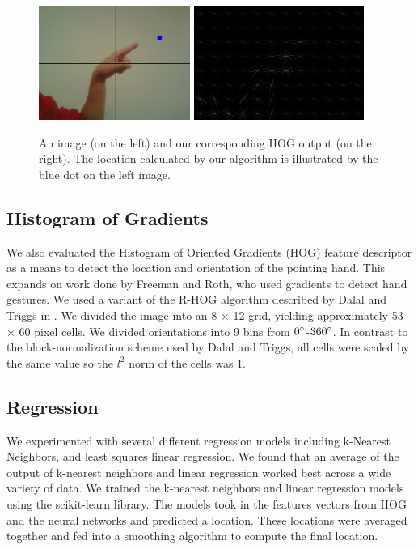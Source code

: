 \documentclass[10pt,twocolumn,letterpaper]{article}
\begin{document}
\begin{figure}
	\begin{center}
		\includegraphics[height=140px]{figures/PointImage.png}
		\includegraphics[height=140px]{figures/PointHOG.png}
	\end{center}
	\caption{An image (on the left) and our corresponding HOG output (on the right). The location calculated by our algorithm is illustrated by the blue dot on the left image.}
	\label{fig:pointImages}
\end{figure}

\subsection{Histogram of Gradients}

We also evaluated the Histogram of Oriented Gradients (HOG) feature descriptor \cite{dalal2005histograms} as a means to detect the location and orientation of the pointing hand. This expands on work done by Freeman and Roth, who used gradients to detect hand gestures. We used a variant of the R-HOG algorithm described by Dalal and Triggs in \cite{dalal2005histograms}. We divided the image into an 8 $\times$ 12 grid, yielding approximately 53 $\times$ 60 pixel cells. We divided orientations into 9 bins from $0\degree$-$360\degree$. In contrast to the block-normalization scheme used by Dalal and Triggs, all cells were scaled by the same value so the $l^2$ norm of the cells was 1.

\subsection{Regression}
We experimented with several different regression models including k-Nearest Neighbors, and least squares linear regression. We found that an average of the output of k-nearest neighbors and linear regression worked best across a wide variety of data. We trained the k-nearest neighbors and linear regression models using the scikit-learn library\cite{scikit-learn}.  The models took in the features vectors from HOG and the neural networks and predicted a location. These locations were averaged together and fed into a smoothing algorithm to compute the final location.
\end{document}
